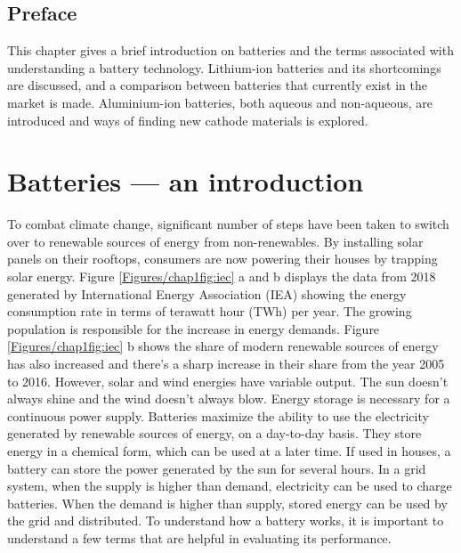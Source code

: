 
\section*{\centering Preface}
This chapter gives a brief introduction on batteries and the terms associated with understanding a battery technology. Lithium-ion batteries and its shortcomings are discussed, and a comparison between batteries that currently exist in the market is made. Aluminium-ion batteries, both aqueous and non-aqueous, are introduced and ways of finding new cathode materials is explored.
\newpage
\chapter{Batteries --- an introduction} %
 \label{chap1} %
\newcommand{\keyword}[1]{\textbf{#1}}
\newcommand{\tabhead}[1]{\textbf{#1}}
\newcommand{\code}[1]{\texttt{#1}}
\newcommand{\file}[1]{\texttt{\bfseries#1}}
\newcommand{\option}[1]{\texttt{\itshape#1}}

To combat climate change, significant number of steps have been taken to switch over to renewable sources of energy from non-renewables. By installing solar panels on their rooftops, consumers are now powering their houses by trapping solar energy. Figure \ref{Figures/chap1fig:iec} a and b displays the data from 2018 generated by International Energy Association (IEA) showing the energy consumption rate in terms of terawatt hour (TWh) per year. The growing population is responsible for the increase in energy demands. Figure \ref{Figures/chap1fig:iec} b shows the share of modern renewable sources of energy has also increased and there's a sharp increase in their share from the year 2005 to 2016. However, solar and wind energies have variable output. The sun doesn't always shine and the wind doesn't always blow. Energy storage is necessary for a continuous power supply. Batteries maximize the ability to use the electricity generated by renewable sources of energy, on a day-to-day basis. They store energy in a chemical form, which can be used at a later time. If used in houses, a battery can store the power generated by the sun for several hours. In a grid system, when the supply is higher than demand, electricity can be used to charge batteries. When the demand is higher than supply, stored energy can be used by the grid and distributed. To understand how a battery works, it is important to understand a few terms that are helpful in evaluating its performance.  

